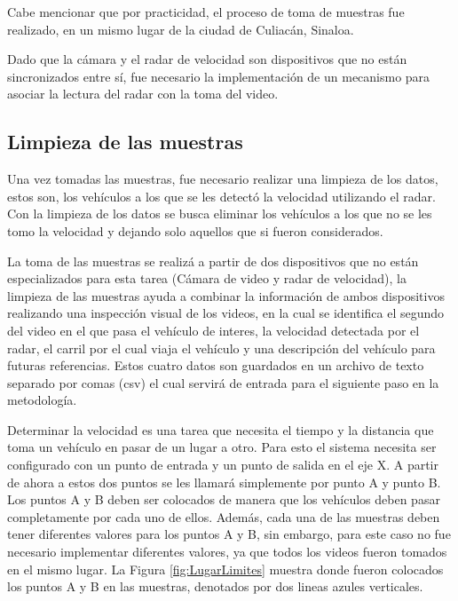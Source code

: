 Cabe mencionar que por practicidad, el proceso de toma de muestras fue realizado, en un mismo lugar de la ciudad de Culiacán, Sinaloa.

Dado que la cámara y el radar de velocidad son dispositivos que no están sincronizados entre sí, fue necesario la implementación de un mecanismo para asociar la lectura del radar con la toma del video.


\subsection{Limpieza de las muestras}

Una vez tomadas las muestras, fue necesario realizar una limpieza de los datos, estos son, los vehículos a los que se les detectó la velocidad utilizando el radar. Con la limpieza de los datos se busca eliminar los vehículos a los que no se les tomo la velocidad y dejando solo aquellos que si fueron considerados.

La toma de las muestras se realizá a partir de dos dispositivos que no están especializados para esta tarea (Cámara de video y radar de velocidad), la limpieza de las muestras ayuda a combinar la información de ambos dispositivos realizando una inspección visual de los videos, en la cual se identifica el segundo del video en el que pasa el vehículo de interes, la velocidad detectada por el radar, el carril por el cual viaja el vehículo y una descripción del vehículo para futuras referencias. Estos cuatro datos son guardados en un archivo de texto separado por comas (csv) el cual servirá de entrada para el siguiente paso en la metodología.

Determinar la velocidad es una tarea que necesita el tiempo y la distancia que toma un vehículo en pasar de un lugar a otro. Para esto el sistema necesita ser configurado con un punto de entrada y un punto de salida en el eje X. A partir de ahora a estos dos puntos se les llamará simplemente por punto A y punto B.  Los puntos A y B deben ser colocados de manera que los vehículos deben pasar completamente por cada uno de ellos. Además, cada una de las muestras deben tener diferentes valores para los puntos A y B, sin embargo, para este caso no fue necesario implementar diferentes valores, ya que todos los videos fueron tomados en el mismo lugar. La Figura \ref{fig:LugarLimites} muestra donde fueron colocados los puntos A y B en las muestras, denotados por dos lineas azules verticales.


